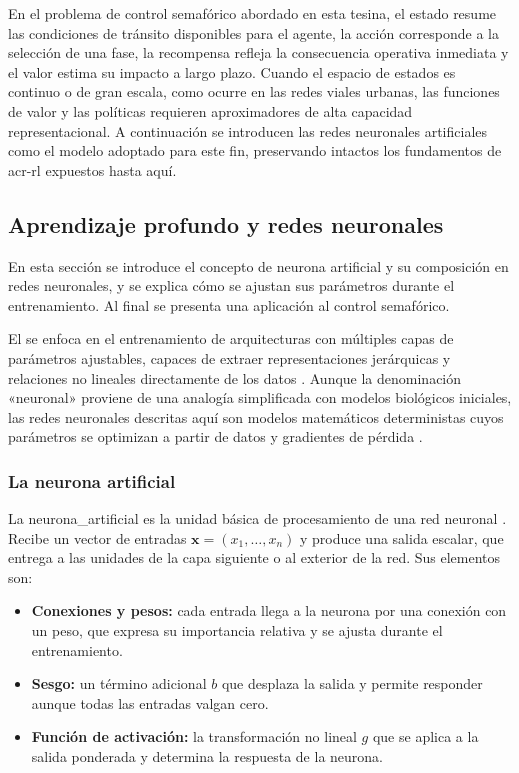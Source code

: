 En el problema de control semafórico abordado en esta tesina, el estado resume las condiciones de tránsito disponibles para el agente, la acción corresponde a la selección de una fase, la recompensa refleja la consecuencia operativa inmediata y el valor estima su impacto a largo plazo. Cuando el espacio de estados es continuo o de gran escala, como ocurre en las redes viales urbanas, las funciones de valor y las políticas requieren aproximadores de alta capacidad representacional. A continuación se introducen las redes neuronales artificiales como el modelo adoptado para este fin, preservando intactos los fundamentos de \acrshort{acr-rl} expuestos hasta aquí.

\subsection{Aprendizaje profundo y redes neuronales}

En esta sección se introduce el concepto de neurona artificial y su composición en redes neuronales, y se explica cómo se ajustan sus parámetros durante el entrenamiento. Al final se presenta una aplicación al control semafórico.

El  se enfoca en el entrenamiento de arquitecturas con múltiples capas de parámetros ajustables, capaces de extraer representaciones jerárquicas y relaciones no lineales directamente de los datos \cite{bishop2024deep,goodfellow2016deep}. Aunque la denominación «neuronal» proviene de una analogía simplificada con modelos biológicos iniciales, las redes neuronales descritas aquí son modelos matemáticos deterministas cuyos parámetros se optimizan a partir de datos y gradientes de pérdida \cite{goodfellow2016deep}.

\subsubsection{La neurona artificial}

La \gls{neurona_artificial} es la unidad básica de procesamiento de una red neuronal \cite{bishop2024deep,goodfellow2016deep}. Recibe un vector de entradas $\mathbf{x} = (x_1, \dots, x_n)$ y produce una salida escalar, que entrega a las unidades de la capa siguiente o al exterior de la red. Sus elementos son:
\begin{itemize}
    \item \textbf{Conexiones y pesos:} cada entrada llega a la neurona por una conexión con un peso, que expresa su importancia relativa y se ajusta durante el entrenamiento.
    \item \textbf{Sesgo:} un término adicional $b$ que desplaza la salida y permite responder aunque todas las entradas valgan cero.
    \item \textbf{Función de activación:} la transformación no lineal $g$ que se aplica a la salida ponderada y determina la respuesta de la neurona.
\end{itemize}

